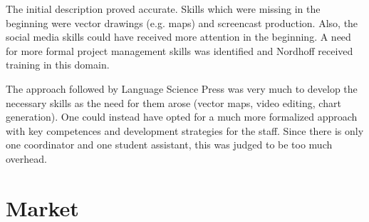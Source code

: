 \documentclass[nonflat,smallfont
]{langsci/langscibook}
\newcommand{\evaluation}[1]{
  \renewcommand{\tblslinecolour}{lsLightOrange}
  \tblssy{receipt}{Evaluation}{\vspace*{-5mm}#1}
}
\newcommand{\othersolutions}[1]{
  \renewcommand{\tblslinecolour}{lsDarkGreenOne}
  \tblssy{more}{Other solutions}{\vspace*{-5mm}#1}
}
\renewcommand{\tblssy}[4][black!12]{%
  \renewcommand{\langscisymbol}{#2}\renewcommand{\tblsboxcolor}{#1}
  \begin{mdframed}[style=yellowexercise,frametitle={#3}]
    #4
  \end{mdframed}
}
\begin{document}
\largerpage[2]
\evaluation{The initial description proved accurate. Skills which were missing in the beginning were vector drawings (e.g. maps) and screencast production. Also, the social media skills could have received more attention in the beginning.  A need for more formal project management skills was identified and Nordhoff received training in this domain.}
\othersolutions{The approach followed by Language Science Press was very much to develop the necessary skills as the need for them arose (vector maps, video editing, chart generation). One could instead have opted for a much more formalized approach with key competences and development strategies for the staff. Since there is only one coordinator and one student assistant, this was judged to be too much overhead.}

\clearpage 
\chapter{Market}
\end{document}
